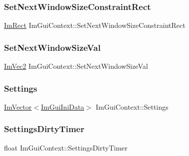 \hypertarget{struct_im_gui_context_ab0e529d62651845ef9ae265447e1d0c8}{}\label{struct_im_gui_context_ab0e529d62651845ef9ae265447e1d0c8} 
\subsubsection{\texorpdfstring{Set\+Next\+Window\+Size\+Constraint\+Rect}{SetNextWindowSizeConstraintRect}}
{\footnotesize\ttfamily \hyperlink{struct_im_rect}{Im\+Rect} Im\+Gui\+Context\+::\+Set\+Next\+Window\+Size\+Constraint\+Rect}

\hypertarget{struct_im_gui_context_a80a09eeab06dd8abaa79cc5d26998af4}{}\label{struct_im_gui_context_a80a09eeab06dd8abaa79cc5d26998af4} 
\subsubsection{\texorpdfstring{Set\+Next\+Window\+Size\+Val}{SetNextWindowSizeVal}}
{\footnotesize\ttfamily \hyperlink{struct_im_vec2}{Im\+Vec2} Im\+Gui\+Context\+::\+Set\+Next\+Window\+Size\+Val}

\hypertarget{struct_im_gui_context_ad7786303f4a54b3dc702e4e646a10bad}{}\label{struct_im_gui_context_ad7786303f4a54b3dc702e4e646a10bad} 
\subsubsection{\texorpdfstring{Settings}{Settings}}
{\footnotesize\ttfamily \hyperlink{class_im_vector}{Im\+Vector}$<$\hyperlink{struct_im_gui_ini_data}{Im\+Gui\+Ini\+Data}$>$ Im\+Gui\+Context\+::\+Settings}

\hypertarget{struct_im_gui_context_a7e0dd3aef4a4f0fd85ed39e13824f2ab}{}\label{struct_im_gui_context_a7e0dd3aef4a4f0fd85ed39e13824f2ab} 
\subsubsection{\texorpdfstring{Settings\+Dirty\+Timer}{SettingsDirtyTimer}}
{\footnotesize\ttfamily float Im\+Gui\+Context\+::\+Settings\+Dirty\+Timer}

